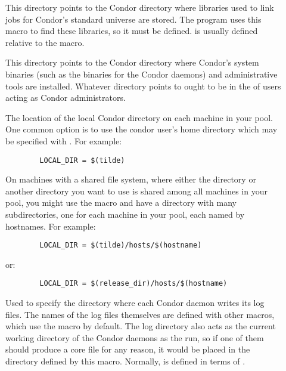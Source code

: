 \begin{description}
\item[] \label{param:Lib} This directory points to the
  Condor directory where libraries used to link jobs for Condor's
  standard universe are stored.  The  program uses
  this macro to find these libraries, so it must be defined.
   is usually defined relative to the
   macro.

\item[] \label{param:Sbin} This directory points to the
  Condor directory where Condor's system binaries (such as the
  binaries for the Condor daemons) and administrative tools are
  installed.  Whatever directory  points to ought
  to be in the  of users acting as Condor
  administrators.

\item[] \label{param:LocalDir} The location of the
  local Condor directory on each machine in your pool.  One common
  option is to use the condor user's home directory which may be
  specified with .  For example:
\begin{verbatim}
        LOCAL_DIR = $(tilde)
\end{verbatim}
  
  On machines with a shared file system, where either the
   directory or another directory you want to use is
  shared among all machines in your pool, you might use the
   macro and have a directory with many
  subdirectories, one for each machine in your pool, each named by
  hostnames.  For example:
\begin{verbatim}
        LOCAL_DIR = $(tilde)/hosts/$(hostname)      
\end{verbatim}
  or:
\begin{verbatim}
        LOCAL_DIR = $(release_dir)/hosts/$(hostname)
\end{verbatim}
  
\item[] \label{param:Log} Used to specify the
  directory where each Condor daemon writes its log files.  The names
  of the log files themselves are defined with other macros, which use
  the  macro by default.  The log directory also acts as
  the current working directory of the Condor daemons as the run, so
  if one of them should produce a core file for any reason, it would
  be placed
  in the directory defined by this macro.  Normally,  is
  defined in terms of .
  

\end{description}
